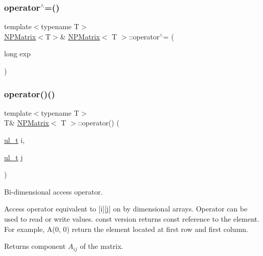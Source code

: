 \subsubsection{\texorpdfstring{operator$^\wedge$=()}{operator^=()}}
{\footnotesize\ttfamily template$<$typename T$>$ \\
\mbox{\hyperlink{class_n_p_matrix}{N\+P\+Matrix}}$<$T$>$\& \mbox{\hyperlink{class_n_p_matrix}{N\+P\+Matrix}}$<$ T $>$\+::operator$^\wedge$= (\begin{DoxyParamCaption}\item[{long}]{exp }\end{DoxyParamCaption})\hspace{0.3cm}{\ttfamily [inline]}}

\mbox{\label{class_n_p_matrix_a437ba12a96e979b50f6d579400b20f6f}} 
\subsubsection{\texorpdfstring{operator()()}{operator()()}\hspace{0.1cm}{\footnotesize\ttfamily [1/4]}}
{\footnotesize\ttfamily template$<$typename T$>$ \\
T\& \mbox{\hyperlink{class_n_p_matrix}{N\+P\+Matrix}}$<$ T $>$\+::operator() (\begin{DoxyParamCaption}\item[{\mbox{\hyperlink{typedef_8h_a1b140a2034db3f5dfe18a987745df43a}{ul\+\_\+t}}}]{i,  }\item[{\mbox{\hyperlink{typedef_8h_a1b140a2034db3f5dfe18a987745df43a}{ul\+\_\+t}}}]{j }\end{DoxyParamCaption})\hspace{0.3cm}{\ttfamily [inline]}}



Bi-\/dimensional access operator. 

Access operator equivalent to {\ttfamily \mbox{[}i\mbox{]}\mbox{[}j\mbox{]}} on by dimensional arrays. Operator can be used to read or write values. {\ttfamily const} version returns {\ttfamily const} reference to the element. For example, {\ttfamily A(0, 0)} return the element located at first row and first column. \begin{DoxyReturn}{Returns}
component $ A_{ij} $ of the matrix. 
\end{DoxyReturn}
\mbox{\label{class_n_p_matrix_aa512abe782fac9e6b0d2eb1167df4133}} 
